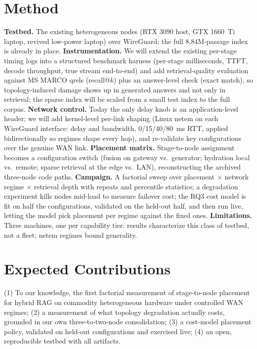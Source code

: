 \documentclass[10pt]{article}
\begin{document}
\section{Method}
\textbf{Testbed.} The existing heterogeneous nodes (RTX 3090 host, GTX 1660~Ti laptop, revived
low-power laptop) over WireGuard; the full 8.84M-passage index is already in place.
\textbf{Instrumentation.} We will extend the existing per-stage timing logs into a structured
benchmark harness (per-stage milliseconds, TTFT, decode throughput, true stream end-to-end) and add
retrieval-quality evaluation against MS MARCO qrels (recall@$k$) plus an answer-level check
(exact match), so topology-induced damage shows up in generated answers and not only in retrieval;
the sparse index will be scaled from a small test index to the full corpus.
\textbf{Network control.} Today the only delay knob is an application-level header; we will add
kernel-level per-link shaping (Linux netem on each WireGuard interface: delay and bandwidth,
0/15/40/80~ms RTT, applied bidirectionally so regimes shape every hop), and re-validate key
configurations over the genuine
WAN link. \textbf{Placement matrix.} Stage-to-node assignment becomes a configuration switch
(fusion on gateway vs.\ generator; hydration local vs.\ remote; sparse retrieval at the edge
vs.\ LAN), reconstructing the archived three-node code paths. \textbf{Campaign.} A factorial sweep
over placement $\times$ network regime $\times$ retrieval depth with repeats and percentile
statistics; a degradation experiment kills nodes mid-load to measure failover cost; the RQ3 cost
model is fit on half the configurations, validated on the held-out half, and then run live, letting
the model pick placement per regime against the fixed ones. \textbf{Limitations.} Three machines,
one per capability tier: results characterize this class of testbed, not a fleet; netem regimes
bound generality.

\section{Expected Contributions}
(1) To our knowledge, the first factorial measurement of stage-to-node placement for hybrid RAG on
commodity
heterogeneous hardware under controlled WAN regimes; (2) a measurement of what topology
degradation actually costs, grounded in our own three-to-two-node consolidation; (3) a cost-model
placement policy, validated on held-out configurations and exercised live; (4) an open,
reproducible testbed with all artifacts.
\end{document}
